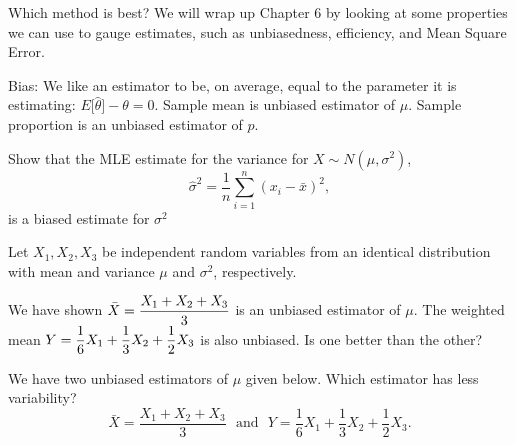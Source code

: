   \alert{Which method is best?} We will wrap up Chapter 6 by looking at some properties we can use to gauge estimates, such as unbiasedness, efficiency, and Mean Square Error. \medskip

\bbox
  \alert{Bias:} We like an estimator to be, on average,  equal to the parameter it is estimating: $E \lbrack \hat{\theta} \rbrack -\theta =0$.
  \bi
  \ii Sample mean is unbiased estimator of $\mu$.
  \ii Sample proportion is an unbiased estimator of $p$.
  \ei

\ebox

\bb[resume]
\ii Show that the MLE estimate for the variance for $X \sim N(\mu, \sigma^2)$,
  \[ \hat{\sigma}^2 =\frac{1}{n} \sum_{i=1}^n (x_i-\bar{x})^2,\]
  is a biased estimate for  $\sigma^2$
\ee

  \vspace{3in}


\clearpage



  Let $X_1, X_2, X_3$ be independent random variables from an identical distribution with mean and variance $\mu$ and $\sigma^2$, respectively.

  \bi
  \ii We have shown $\displaystyle \bar{X} = \frac{X_1+X_2+X_3}{3}$ is an unbiased estimator of $\mu$.
  \ii The weighted mean $\displaystyle Y = \frac{1}{6}X_1 + \frac{1}{3}X_2 + \frac{1}{2}X_3$ is also unbiased.
  \ii Is one better than the other?
  \ei

  
\bb[resume]
\ii We have two unbiased estimators of $\mu$ given below.  Which estimator has less variability?
  \[ \bar{X} = \frac{X_1+X_2+X_3}{3} \ \ \ \mbox{and} \ \ \ Y = \frac{1}{6}X_1 + \frac{1}{3}X_2 + \frac{1}{2}X_3.\]

\ms


\ms


